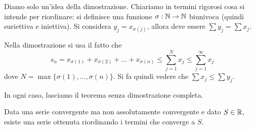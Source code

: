 Diamo solo un'idea della dimostrazione. Chiariamo in termini rigorosi cosa si intende per riordinare: si definisce una funzione $\sigma:  \mathbb N \rightarrow \mathbb N$ biunivoca (quindi suriettiva e iniettiva). Si considera $y_j = x_{\sigma(j)}$, allora deve essere $\sum y_j = \sum x_j$.

Nella dimostrazione si usa il fatto che
\begin{equation*}
s_n = x_{\sigma(1)} + x_{\sigma(2)} + \ldots + x_{\sigma(n)} \le \sum_{j=1}^N x_j \le \sum_{j=1}^\infty x_j
\end{equation*}
dove $N = \max \{ \sigma(1), \ldots, \sigma(n)\}$.
Si fa quindi vedere che $\sum x_j \le \sum y_j$.

In ogni caso, lasciamo il teorema senza dimostrazione completa.

\begin{remark}
Data una serie convergente ma non assolutamente convergente e dato $S \in \mathbb R$, esiste una serie ottenuta riordinando i termini che converge a $S$.
\end{remark}


